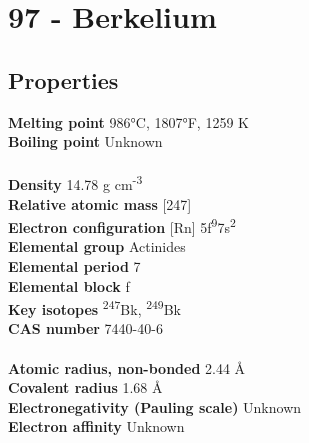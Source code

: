 \section{97 - Berkelium}
\label{sec:elem-berkelium}
\subsection{Properties}
\textbf{Melting point} 986°C, 1807°F, 1259 K\\
\textbf{Boiling point} Unknown\\
\\
\textbf{Density} 14.78 g cm\textsuperscript{-3}\\
\textbf{Relative atomic mass} [247]\\
\textbf{Electron configuration} [Rn] 5f\textsuperscript{9}7s\textsuperscript{2}\\
\textbf{Elemental group} Actinides\\
\textbf{Elemental period} 7\\
\textbf{Elemental block} f\\
\textbf{Key isotopes} \textsuperscript{247}Bk, \textsuperscript{249}Bk\\
\textbf{CAS number} 7440-40-6\\
\\
\textbf{Atomic radius, non-bonded} 2.44 Å\\
\textbf{Covalent radius} 1.68 Å\\
\textbf{Electronegativity (Pauling scale)} Unknown\\
\textbf{Electron affinity} Unknown\\
